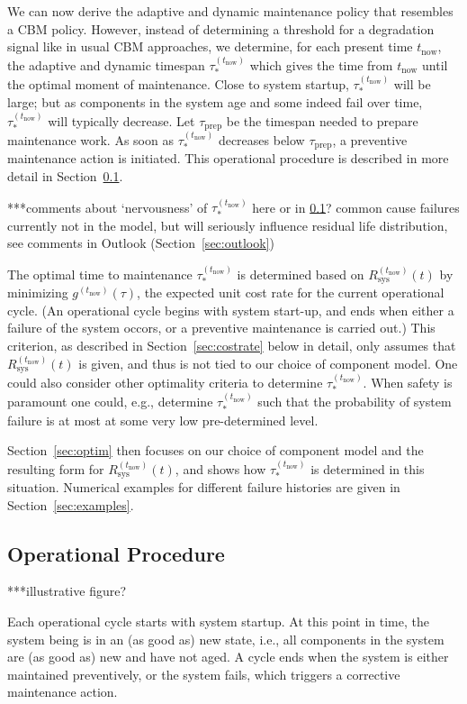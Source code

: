 \documentclass[authoryear]{elsarticle}
\def\tnow{t_\text{now}}
\newcommand{\Rsysnow}{R^{(t_\text{now})}_\text{sys}}
\newcommand{\gnow}{g^{(\tnow)}}
\newcommand{\tausnow}{\tau_*^{(\tnow)}}
\newcommand{\tprep}{\tau_{\text{prep}}}
\begin{document}
We can now derive the adaptive and dynamic maintenance policy
that resembles a CBM policy.
However, instead of determining a threshold for a degradation signal like in usual CBM approaches,
we determine, for each present time $\tnow$,
the adaptive and dynamic timespan $\tausnow$ which gives the time from $\tnow$ until the optimal moment of maintenance.
Close to system startup, $\tausnow$ will be large;
but as components in the system age and some indeed fail over time,
$\tausnow$ will typically decrease.
Let $\tprep$ be the timespan needed to prepare maintenance work.
As soon as $\tausnow$ decreases below $\tprep$,
a preventive maintenance action is initiated.
This operational procedure is described in more detail in Section~\ref{sec:operationalprocedure}.

***comments about `nervousness' of $\tausnow$ here or in \ref{sec:operationalprocedure}?
common cause failures currently not in the model, but will seriously influence residual life distribution,
see comments in Outlook (Section~\ref{sec:outlook})

The optimal time to maintenance $\tausnow$ is determined based on $\Rsysnow(t)$
by minimizing $\gnow(\tau)$, the expected unit cost rate for the current operational cycle.
(An operational cycle begins with system start-up,
and ends when either a failure of the system occors, or a preventive maintenance is carried out.)
This criterion, as described in Section~\ref{sec:costrate} below in detail,
only assumes that $\Rsysnow(t)$ is given,
and thus is not tied to our choice of component model.
One could also consider other optimality criteria to determine $\tausnow$.
When safety is paramount one could, e.g., determine $\tausnow$ such that
the probability of system failure is at most at some very low pre-determined level.

Section~\ref{sec:optim} then focuses on our choice of component model and the resulting form for $\Rsysnow(t)$,
and shows how $\tausnow$ is determined in this situation.
Numerical examples for different failure histories are given in Section~\ref{sec:examples}.


\subsection{Operational Procedure}
\label{sec:operationalprocedure}

***illustrative figure?

Each operational cycle starts with system startup.
At this point in time, the system being is in an (as good as) new state,
i.e., all components in the system are (as good as) new and have not aged.
A cycle ends when the system is either maintained preventively, %
or the system fails, which triggers a corrective maintenance action.
\end{document}
